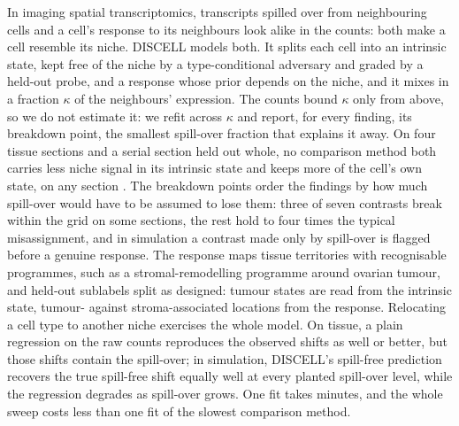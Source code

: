 In imaging spatial transcriptomics, transcripts spilled over from neighbouring cells and a cell's response to its neighbours look alike in the counts: both make a cell resemble its niche. DISCELL models both. It splits each cell into an intrinsic state, kept free of the niche by a type-conditional adversary and graded by a held-out probe, and a response whose prior depends on the niche, and it mixes in a fraction $\kappa$ of the neighbours' expression. The counts bound $\kappa$ only from above, so we do not estimate it: we refit across $\kappa$ and report, for every finding, its breakdown point, the smallest spill-over fraction that explains it away. On four tissue sections and a serial section held out whole, no comparison method both carries less niche signal in its intrinsic state and keeps more of the cell's own state, on any section . The breakdown points order the findings by how much spill-over would have to be assumed to lose them: three of seven contrasts break within the grid on some sections, the rest hold to four times the typical misassignment, and in simulation a contrast made only by spill-over is flagged before a genuine response. The response maps tissue territories with recognisable programmes, such as a stromal-remodelling programme around ovarian tumour, and held-out sublabels split as designed: tumour states are read from the intrinsic state, tumour- against stroma-associated locations from the response. Relocating a cell type to another niche exercises the whole model. On tissue, a plain regression on the raw counts reproduces the observed shifts as well or better, but those shifts contain the spill-over; in simulation, DISCELL's spill-free prediction recovers the true spill-free shift equally well at every planted spill-over level, while the regression degrades as spill-over grows. One fit takes minutes, and the whole sweep costs less than one fit of the slowest comparison method.
